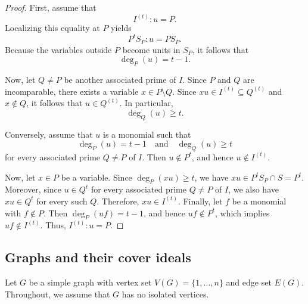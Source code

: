 \documentclass[12pt,amscd]{amsart}
\theoremstyle{definition}
\numberwithin{equation}{section}
\begin{document}
\begin{proof}
First, assume that
\[
I^{(t)} : u = P.
\]
Localizing this equality at $P$ yields
\[
P^t S_P : u = P S_P.
\]
Because the variables outside $P$ become units in $S_P$, it follows that
\[
\deg_P(u) = t - 1.
\]

Now, let $Q \neq P$ be another associated prime of $I$. Since $P$ and $Q$ are incomparable, there exists a variable $x \in P \setminus Q$. Since $xu \in I^{(t)} \subseteq Q^{(t)}$ and $x \notin Q$, it follows that $u \in Q^{(t)}$. In particular,
\[
\deg_Q(u) \ge t.
\]

Conversely, assume that $u$ is a monomial such that
\[
\deg_P(u) = t - 1 \quad \text{and} \quad \deg_Q(u) \ge t
\]
for every associated prime $Q \neq P$ of $I$. Then $u \notin P^t$, and hence $u \notin I^{(t)}$. 

Now, let $x \in P$ be a variable. Since $\deg_P(xu) \ge t$, we have $xu \in P^t S_P \cap S = P^t$. Moreover, since $u \in Q^t$ for every associated prime $Q \neq P$ of $I$, we also have $xu \in Q^t$ for every such $Q$. Therefore, $xu \in I^{(t)}$. Finally, let $f$ be a monomial with $f \notin P$. Then $\deg_P(uf) = t - 1$, and hence $uf \notin P^t$, which implies $uf \notin I^{(t)}$. Thus, $I^{(t)} : u = P$.
\end{proof}






\subsection{Graphs and their cover ideals}  Let $G$ be a simple graph with vertex set $V(G) = \{1, \ldots, n\}$ and edge set $E(G)$. Throughout, we assume that $G$ has no isolated vertices. 
\end{document}

